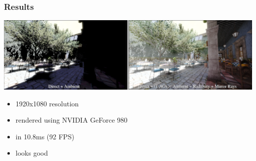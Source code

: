 \documentclass[aspectratio=169]{beamer}
\begin{document}
	\begin{frame}
		\frametitle{Results}
		\includegraphics[width=\textwidth]{img/deep_g_buffer_render.png}
		\begin{itemize}
			\item 1920x1080 resolution
			\item rendered using NVIDIA GeForce 980
			\item in 10.8ms (92 FPS)
			\item looks good
		\end{itemize}
	\end{frame}
\end{document}
